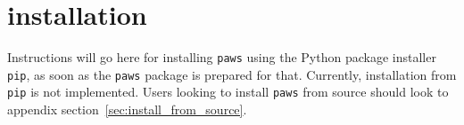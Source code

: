 \chapter{installation}
\label{ch:installation}

Instructions will go here for installing \verb|paws| using 
the Python package installer \verb|pip|,
as soon as the \verb|paws| package is prepared for that.
Currently, installation from \verb|pip| is not implemented.
Users looking to install \verb|paws| from source
should look to appendix section~\ref{sec:install_from_source}.


